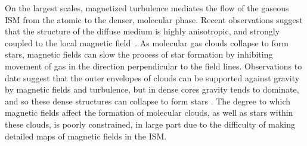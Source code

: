 \documentclass[PICOReport.tex]{subfiles}
\begin{document}
On the largest scales, magnetized turbulence mediates the flow of the gaseous \ac{ISM} from the atomic to the denser, molecular phase. Recent observations suggest that the structure of the diffuse medium is highly anisotropic, and strongly coupled to the local magnetic field~\citep{Clark:2014, Clark:2015, Kalberla:2016, KalberlaKerp:2016}. As molecular gas clouds collapse to form stars, magnetic fields can slow the process of star formation by inhibiting movement of gas in the direction perpendicular to the field lines. Observations to date suggest that the outer envelopes of clouds can be supported against gravity by magnetic fields and turbulence, but in dense cores gravity tends to dominate, and so these dense structures can collapse to form stars \citep{Crutcher2010}.  The degree to which magnetic fields affect the formation of molecular clouds, as well as stars within these clouds, is poorly constrained, in large part due to the difficulty of making detailed maps of magnetic fields in the ISM.


\end{document}
